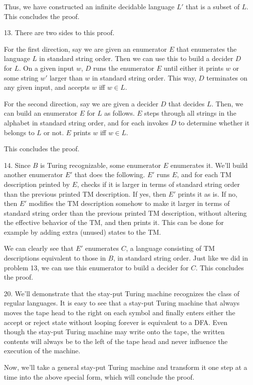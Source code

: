 \documentclass{article}
\begin{document}
Thus, we have constructed an infinite decidable language $L'$ that is a subset of $L$. This concludes the proof.

13. There are two sides to this proof.

For the first direction, say we are given an enumerator $E$ that enumerates the language $L$ in standard string order. Then we can use this to build a decider $D$ for $L$. On a given input $w$, $D$ runs the enumerator $E$ until either it prints $w$ or some string $w'$ larger than $w$ in standard string order. This way, $D$ terminates on any given input, and accepts $w$ iff $w \in L$.

For the second direction, say we are given a decider $D$ that decides $L$. Then, we can build an enumerator $E$ for $L$ as follows. $E$ steps through all strings in the alphabet in standard string order, and for each invokes $D$ to determine whether it belongs to $L$ or not. $E$ prints $w$ iff $w \in L$.

This concludes the proof.

14. Since $B$ is Turing recognizable, some enumerator $E$ enumerates it. We'll build another enumerator $E'$ that does the following. $E'$ runs $E$, and for each TM description printed by $E$, checks if it is larger in terms of standard string order than the previous printed TM description. If yes, then $E'$ prints it as is. If no, then $E'$ modifies the TM description somehow to make it larger in terms of standard string order than the previous printed TM description, without altering the effective behavior of the TM, and then prints it. This can be done for example by adding extra (unused) states to the TM.

We can clearly see that $E'$ enumerates $C$, a language consisting of TM descriptions equivalent to those in $B$, in standard string order. Just like we did in problem 13, we can use this enumerator to build a decider for $C$. This concludes the proof.

20. We'll demonstrate that the stay-put Turing machine recognizes the class of regular languages. It is easy to see that a stay-put Turing machine that always moves the tape head to the right on each symbol and finally enters either the accept or reject state without looping forever is equivalent to a DFA. Even though the stay-put Turing machine may write onto the tape, the written contents will always be to the left of the tape head and never influence the execution of the machine.

Now, we'll take a general stay-put Turing machine and transform it one step at a time into the above special form, which will conclude the proof.
\end{document}
